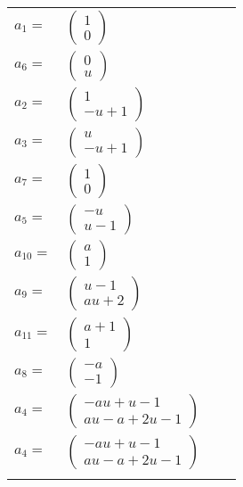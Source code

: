 \documentclass[1p]{elsarticle_modified}
\theoremstyle{definition}
\begin{document}
\begin{tabular}{m{7pt} m{180pt} m{7pt} m{180pt} }
\flushright $a_{1}=$&$\begin{pmatrix}1\\0\end{pmatrix}$ \\
\flushright $a_{6}=$&$\begin{pmatrix}0\\u\end{pmatrix}$ \\
\flushright $a_{2}=$&$\begin{pmatrix}1\\- u+1\end{pmatrix}$ \\
\flushright $a_{3}=$&$\begin{pmatrix}u\\- u+1\end{pmatrix}$ \\
\flushright $a_{7}=$&$\begin{pmatrix}1\\0\end{pmatrix}$ \\
\flushright $a_{5}=$&$\begin{pmatrix}- u\\u-1\end{pmatrix}$ \\
\flushright $a_{10}=$&$\begin{pmatrix}a\\1\end{pmatrix}$ \\
\flushright $a_{9}=$&$\begin{pmatrix}u-1\\a u+2\end{pmatrix}$ \\
\flushright $a_{11}=$&$\begin{pmatrix}a+1\\1\end{pmatrix}$ \\
\flushright $a_{8}=$&$\begin{pmatrix}- a\\-1\end{pmatrix}$ \\
\flushright $a_{4}=$&$\begin{pmatrix}- a u+u-1\\a u- a+2 u-1\end{pmatrix}$\\ \flushright $a_{4}=$&$\begin{pmatrix}- a u+u-1\\a u- a+2 u-1\end{pmatrix}$\\&\end{tabular}
\end{document}
